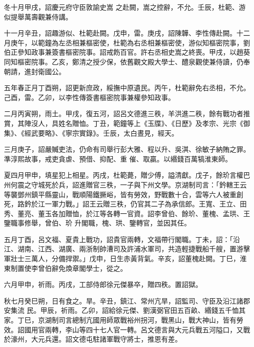 \begin{pinyinscope}
 冬十月甲戌，詔慶元府守臣敦諭史嵩
 之赴闕，嵩之控辭，不允。壬辰，杜範、游似提舉萬壽觀兼侍講。



 十一月辛丑，詔趣游似、杜範赴闕。戊申，雷。庚戌，詔陳韡、李性傳赴闕。十二月庚午，以範鐘為左丞相兼樞密使，杜範為右丞相兼樞密使，游似知樞密院事，劉伯正參知政事兼簽書樞密院事。詔戒飭百官。許右丞相史嵩之終喪。甲戌，以趙葵同知樞密院事。乙亥，鄭清之授少保，依舊觀文殿大學士、醴泉觀使兼侍讀，仍奉朝請，進封衛國公。



 五年春正月丁酉朔，詔更新庶政，綏撫中原遺民。丙午，杜範辭免右丞相，不允。己酉，雷。乙卯，以李性傳簽書樞密院事兼權參知政事。



 二月丙寅朔，雨土。甲戌，復五河，詔呂文德進三秩，羊洪進二秩，餘有戰功者推賞，其陣沒人，具姓名贈恤。丁丑，範鐘等上《玉牒》、《日歷》及孝宗、光宗《御集》、《經武要略》、《寧宗實錄》。壬辰，太白晝見，經天。



 三月庚子，詔嚴贓吏法，仍命有司舉行彭大雅、程以升、吳淇、徐敏子納賄之罪。準淳熙故事，戒吏貪虐、預借、抑配、重
 催、取贏。以緡錢百萬犒淮東師。



 夏四月甲申，填星犯上相星。丙戌，杜範薨，贈少傅，謚清獻。戊子，餘玠言權巴州何震之守城死於兵，詔進贈官三秩，一子與下州文學。京湖制司言：「鈐轄王云等襲鄧州鎮平縣靈山，戰順陽鐵撅峪，皆有勞效，野戰數十合，雲等六人被重創死，路鈐於江一軍力戰。」詔王云贈三秩，仍官其二子為承信郎。王寬、王立、田秀、董亮、董玉各加贈恤，於江等各轉一官資。詔李曾伯、餘玠、董槐、孟珙、王鑒職事修舉，曾伯、玠
 升閣職，槐、珙、鑒轉官，並因其任。



 五月丁酉，呂文福、夏貴上戰功，詔貴官兩轉，文福帶行閣職。丁未，詔：「沿江、湖南、江西、湖廣、兩浙制帥漕司及許浦水軍司，共造輕捷戰船千艘，置游擊軍壯士三萬人，分備捍禦。」戊申，日生赤黃背氣。辛亥，詔董槐赴闕。丁巳，淮東制置使李曾伯辭免煥章閣學士，從之。



 六月甲申，祈雨。丙戌，工部侍郎徐元傑暴卒，贈四秩。置詔獄。



 秋七月癸巳朔，日有食之。旱。辛丑，鎮江、常州亢旱，詔監司、守臣及沿江諸郡安集流
 民。甲辰，祈雨。乙卯，詔給徐元傑、劉漢弼官田五百畝、緡錢五千恤其家。丁巳，京湖制司言總制亢國用師眾戰裕州拐河，戰黑山，戰大神山，皆有勞效。詔國用官兩轉，李山等四十七人官一轉。呂文德言與大元兵戰五河隘口，又戰於濠州，大元兵還。詔文德屯駐諸軍戰守將士，推恩有差。




\end{pinyinscope}
